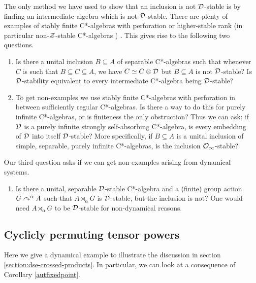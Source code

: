 \documentclass[12pt]{amsart}
\begin{document}
    The only method we have used to show that an inclusion is not $\mathcal{D}$-stable is by finding an intermediate algebra which is not $\mathcal{D}$-stable.
    There are plenty of examples of stably finite C*-algebras with perforation or higher-stable rank (in particular non-$\mathcal{Z}$-stable C*-algebras \cite{Rordam04}) \cite{Villadsen98, Villadsen99,ElliottVilladsen00,Toms05,HirshbergRordamWinter07,Toms08b,Toms08,TomsWinter09,deLacerdaMortari09,Tikuisis12}. This gives rise to the following two questions.

    \begin{enumerate}
      \item Is there a unital inclusion $B \subseteq A$ of separable C*-algebras such that whenever $C$ is such that $B \subseteq C \subseteq A$, we have $C \simeq C \otimes \mathcal{D}$ but $B \subseteq A$ is not $\mathcal{D}$-stable? Is $\mathcal{D}$-stability equivalent to every intermediate C*-algebra being $\mathcal{D}$-stable?
      \item To get non-examples we use stably finite C*-algebras with perforation in between sufficiently regular C*-algebras. Is there a way to do this for purely infinite C*-algebras, or is finiteness the only obstruction? Thus we can ask: if $\mathcal{D}$ is a purely infinite strongly self-absorbing C*-algebra, is every embedding of $\mathcal{D}$ into itself $\mathcal{D}$-stable? More specifically, if $B \subseteq A$ is a unital inclusion of simple, separable, purely infinite C*-algebras, is the inclusion $\mathcal{O}_{\infty}$-stable?
    \end{enumerate}

    Our third question asks if we can get non-examples arising from dynamical systems. 

      \begin{enumerate}
        \item[3.] Is there a unital, separable $\mathcal{D}$-stable C*-algebra and a (finite) group action $G \curvearrowright^\alpha A$ such that $A \rtimes_\alpha G$ is $\mathcal{D}$-stable, but the inclusion is not? One would need $A \rtimes_\alpha G$ to be $\mathcal{D}$-stable for non-dynamical reasons. 
      \end{enumerate}


  \subsection{Cyclicly permuting tensor powers}\label{ssetcion:dse-cyclic-tensor-powers}

  Here we give a dynamical example to illustrate the discussion in section \ref{section:dse-crossed-products}. In particular, we can look at a consequence of Corollary \ref{autfixedpoint}. 
\end{document}
